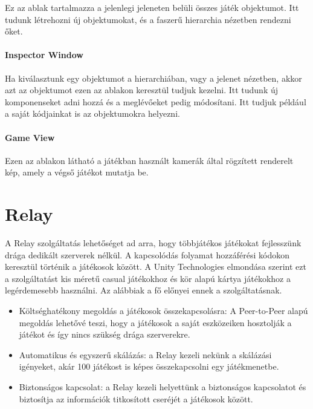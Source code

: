 \documentclass[]{thesis-ekf}
\theoremstyle{definition}
\theoremstyle{remark}
\begin{document}
Ez az ablak tartalmazza a jelenlegi jeleneten belüli összes játék objektumot. Itt tudunk létrehozni új objektumokat, és a faszerű hierarchia nézetben rendezni őket. \cite{UnityHierarchyWindow}

\paragraph{Inspector Window}

Ha kiválasztunk egy objektumot a hierarchiában, vagy a jelenet nézetben, akkor azt az objektumot ezen az ablakon keresztül tudjuk kezelni. Itt tudunk új komponenseket adni hozzá és a meglévőeket pedig módosítani. Itt tudjuk például a saját kódjainkat is az objektumokra helyezni. \cite{UnityInspectorWindow}

\paragraph{Game View}

Ezen az ablakon látható a játékban használt kamerák által rögzített renderelt kép, amely a végső játékot mutatja be. \cite{UnityGameView}

\section{Relay}

\label{sec-relay}
A Relay szolgáltatás lehetőséget ad arra, hogy többjátékos játékokat fejlesszünk drága dedikált szerverek nélkül. A kapcsolódás folyamat hozzáférési kódokon keresztül történik a játékosok között. A Unity Technologies elmondása szerint ezt a szolgáltatást kis méretű casual játékokhoz és kör alapú kártya játékokhoz a legérdemesebb használni. Az alábbiak a fő előnyei ennek a szolgáltatásnak. \cite{UnityRelayService} \cite{UnityRelayDocs}

\begin{itemize}
	\item Költséghatékony megoldás a játékosok összekapcsolásra: A Peer-to-Peer alapú megoldás lehetővé teszi, hogy a játékosok a saját eszközeiken hosztolják a játékot és így nincs szükség drága szerverekre.
	\item Automatikus és egyszerű skálázás: a Relay kezeli nekünk a skálázási igényeket, akár 100 játékost is képes összekapcsolni egy játékmenetbe.
	\item Biztonságos kapcsolat: a Relay kezeli helyettünk a biztonságos kapcsolatot és biztosítja az információk titkosított cseréjét a játékosok között.
\end{itemize}
\end{document}
